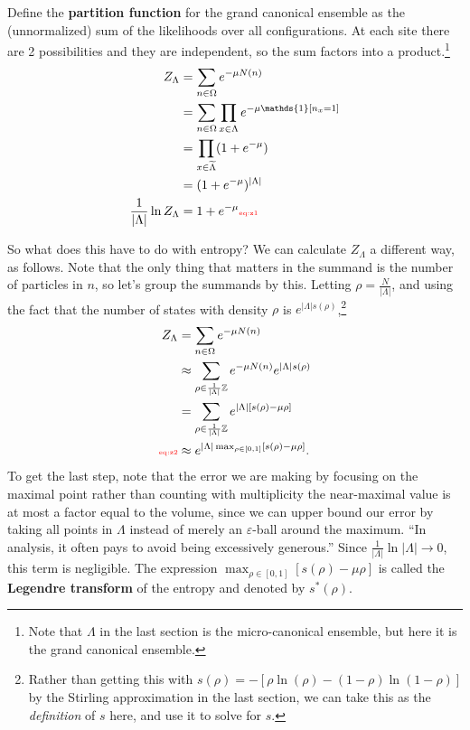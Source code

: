\documentclass[12pt]{book}
\theoremstyle{norm}
\begin{document}
Define the \textbf{partition function} for the grand canonical ensemble as the (unnormalized) sum of the likelihoods over all configurations. At each site there are 2 possibilities and they are independent, so the sum factors into a product.\footnote{Note that $\Lambda$ in the last section is the micro-canonical ensemble, but here it is the grand canonical ensemble.}
\begin{align}
\nonumber
Z_\Lambda & = \sum_{n\in \Omega} e^{-\mu N(n)} \\
\nonumber
&=\sum_{n\in \Omega} \prod_{x\in \Lambda} e^{-\mu \mathds{1}[n_x=1]}\\
\nonumber
&=\prod_{x\in \widetilde{\Lambda}}(1+e^{-\mu})\\
\nonumber
&= (1+e^{-\mu})^{|\Lambda|}\\
\frac{1}{|\Lambda|} \ln Z_{\Lambda} &= 1+e^{-\mu}
\label{eq:z1}\text{{\color{red}\tiny eq:z1}}
\end{align}

So what does this have to do with entropy? We can calculate $Z_\Lambda$ a different way, as follows.
Note that the only thing that matters in the summand is the number of particles in $n$, so let's group the summands by this. Letting $\rho=\frac{N}{|\Lambda|}$, and using the fact that the number of states with density $\rho$ is $e^{|\Lambda|s(\rho)}$,\footnote{Rather than getting this with $s(\rho)=-[\rho\ln(\rho) - (1-\rho) \ln (1-\rho)]$ by the Stirling approximation in the last section, we can take this as the \emph{definition} of $s$ here, and use it to solve for $s$.}
\begin{align}
\nonumber
Z_\Lambda&=\sum_{n\in \Omega} e^{-\mu N(n)}\\
\nonumber
& \approx \sum_{\rho \in \frac{1}{|\Lambda|}\mathbb{Z}} e^{-\mu N(n)} e^{|\Lambda|s(\rho)}\\
\nonumber
& =\sum_{\rho \in \frac{1}{|\Lambda|}\mathbb{Z}} e^{|\Lambda|[s(\rho)-\mu \rho]}\\
\label{eq:z2}\text{{\color{red}\tiny eq:z2}}
&\approx e^{|\Lambda|\max_{\rho\in [0,1]}[s(\rho)-\mu\rho]}.
\end{align}
To get the last step, note that the error we are making by focusing on the maximal point rather than counting with multiplicity the near-maximal value is at most a factor equal to the volume, since we can upper bound our error by taking all points in $\Lambda$ instead of merely an $\varepsilon$-ball around the maximum. ``In analysis, it often pays to avoid being excessively generous.'' Since $\frac{1}{|\Lambda|}\ln |\Lambda|\to 0$, this term is negligible. %
The expression $\max_{\rho\in [0,1]}[s(\rho)-\mu\rho]$ is called the \textbf{Legendre transform} of the entropy and denoted by $s^*(\rho)$. 
\end{document}
